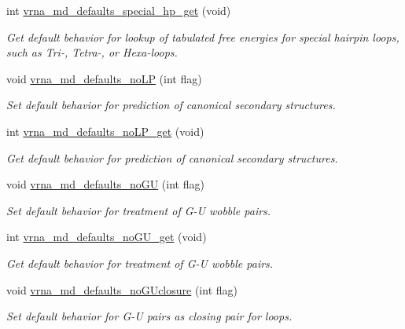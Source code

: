 \begin{DoxyCompactItemize}
int \hyperlink{group__model__details_ga1d68a6efdaa1253cc63fd9cd06452559}{vrna\-\_\-md\-\_\-defaults\-\_\-special\-\_\-hp\-\_\-get} (void)
\begin{DoxyCompactList}\small\item\em Get default behavior for lookup of tabulated free energies for special hairpin loops, such as Tri-\/, Tetra-\/, or Hexa-\/loops. \end{DoxyCompactList}\item 
void \hyperlink{group__model__details_ga2f88ffc393ac9d7987849c965fd29ea8}{vrna\-\_\-md\-\_\-defaults\-\_\-no\-L\-P} (int flag)
\begin{DoxyCompactList}\small\item\em Set default behavior for prediction of canonical secondary structures. \end{DoxyCompactList}\item 
int \hyperlink{group__model__details_ga934344888fbacaed538bbbfe910f2aa6}{vrna\-\_\-md\-\_\-defaults\-\_\-no\-L\-P\-\_\-get} (void)
\begin{DoxyCompactList}\small\item\em Get default behavior for prediction of canonical secondary structures. \end{DoxyCompactList}\item 
void \hyperlink{group__model__details_ga98218f85c7a957a1d1ddf4627fdf5a39}{vrna\-\_\-md\-\_\-defaults\-\_\-no\-G\-U} (int flag)
\begin{DoxyCompactList}\small\item\em Set default behavior for treatment of G-\/\-U wobble pairs. \end{DoxyCompactList}\item 
int \hyperlink{group__model__details_ga5faa7d4e536d7fe36ec25428c0cf2563}{vrna\-\_\-md\-\_\-defaults\-\_\-no\-G\-U\-\_\-get} (void)
\begin{DoxyCompactList}\small\item\em Get default behavior for treatment of G-\/\-U wobble pairs. \end{DoxyCompactList}\item 
void \hyperlink{group__model__details_gade5b9951d71ca2fb357a4e6c0c18ccd1}{vrna\-\_\-md\-\_\-defaults\-\_\-no\-G\-Uclosure} (int flag)
\begin{DoxyCompactList}\small\item\em Set default behavior for G-\/\-U pairs as closing pair for loops. \end{DoxyCompactList}\item 

\end{DoxyCompactItemize}
